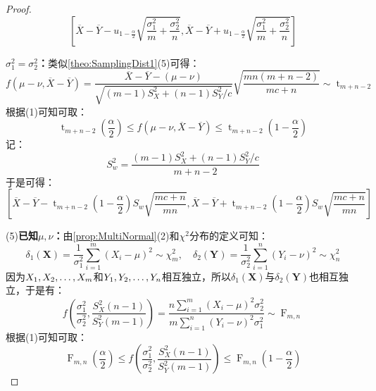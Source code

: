 \begin{proof}
\begin{equation*}
		\left[\overline{X}-\overline{Y}-u_{1-\frac{\alpha}{2}}\sqrt{\dfrac{\sigma_1^2}{m}+\dfrac{\sigma_2^2}{n}},\overline{X}-\overline{Y}+u_{1-\frac{\alpha}{2}}\sqrt{\dfrac{\sigma_1^2}{m}+\dfrac{\sigma_2^2}{n}}\right]
	\end{equation*}\par
	\textbf{$\sigma_1^2=\sigma_2^2$：}类似\cref{theo:SamplingDist1}(5)可得：
	\begin{equation*}
		f(\mu-\nu,\overline{X}-\overline{Y})=\dfrac{\overline{X}-\overline{Y}-(\mu-\nu)}{\sqrt{(m-1)S_X^2+(n-1)S_Y^2/c}}\sqrt{\dfrac{mn(m+n-2)}{mc+n}}\sim \operatorname{t}_{m+n-2}
	\end{equation*}
	根据(1)可知可取：
	\begin{equation*}
		\operatorname{t}_{m+n-2}\left(\frac{\alpha}{2}\right)\leqslant f(\mu-\nu,\overline{X}-\overline{Y})\leqslant \operatorname{t}_{m+n-2}\left(1-\frac{\alpha}{2}\right)
	\end{equation*}
	记：
	\begin{equation*}
		S_w^2=\frac{(m-1)S_X^2+(n-1)S_Y^2/c}{m+n-2}
	\end{equation*}
	于是可得：
	\begin{equation*}
		\left[\overline{X}-\overline{Y}-\operatorname{t}_{m+n-2}\left(1-\frac{\alpha}{2}\right)S_w\sqrt{\dfrac{mc+n}{mn}},\overline{X}-\overline{Y}+\operatorname{t}_{m+n-2}\left(1-\frac{\alpha}{2}\right)S_w\sqrt{\dfrac{mc+n}{mn}}\right]
	\end{equation*}\par
	(5)\textbf{已知$\mu,\nu$：}由\cref{prop:MultiNormal}(2)和$\chi^2$分布的定义可知：
	\begin{equation*}
		\delta_1(\mathbf{X})=\frac{1}{\sigma_1^2}\sum_{i=1}^{m}(X_i-\mu)^2\sim\chi_{m}^2,\quad\delta_2(\mathbf{Y})=\frac{1}{\sigma_2^2}\sum_{i=1}^{n}(Y_i-\nu)^2\sim\chi_{n}^2
	\end{equation*}
	因为$X_1, X_2, \dots, X_{m}$和$Y_1, Y_2, \dots, Y_{n}$相互独立，所以$\delta_1(\mathbf{X})$与$\delta_2(\mathbf{Y})$也相互独立，于是有：
	\begin{equation*}
		f\left(\frac{\sigma_1^2}{\sigma_2^2},\frac{S_X^2(n-1)}{S_Y^2(m-1)}\right)=\frac{n\sum\limits_{i=1}^{m}(X_i-\mu)^2\sigma_2^2}{m\sum\limits_{i=1}^{n}(Y_i-\nu)^2\sigma_1^2}\sim\operatorname{F}_{m,n}
	\end{equation*}
	根据(1)可知可取：
	\begin{equation*}
		\operatorname{F}_{m,n}\left(\frac{\alpha}{2}\right)\leqslant f\left(\frac{\sigma_1^2}{\sigma_2^2},\frac{S_X^2(n-1)}{S_Y^2(m-1)}\right)\leqslant\operatorname{F}_{m,n}\left(1-\frac{\alpha}{2}\right)

\end{equation*}
\end{proof}
